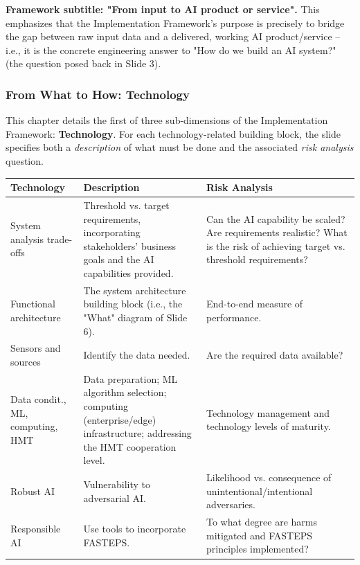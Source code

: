 \textbf{Framework subtitle: "From input to AI product or service".} This emphasizes that the Implementation Framework's purpose is precisely to bridge the gap between raw input data and a delivered, working AI product/service -- i.e., it is the concrete engineering answer to "How do we build an AI system?" (the question posed back in Slide 3).

\subsubsection{From What to How: Technology}

This chapter details the first of three sub-dimensions of the Implementation Framework: \textbf{Technology}. For each technology-related building block, the slide specifies both a \emph{description} of what must be done and the associated \emph{risk analysis} question.

\begin{center}
\begin{tabular}{p{3cm}p{4.6cm}p{4.6cm}}
\toprule
\textbf{Technology} & \textbf{Description} & \textbf{Risk Analysis} \\
\midrule
System analysis trade-offs & Threshold vs. target requirements, incorporating stakeholders' business goals and the AI capabilities provided. & Can the AI capability be scaled? Are requirements realistic? What is the risk of achieving target vs. threshold requirements? \\[0.2cm]
Functional architecture & The system architecture building block (i.e., the "What" diagram of Slide 6). & End-to-end measure of performance. \\[0.2cm]
Sensors and sources & Identify the data needed. & Are the required data available? \\[0.2cm]
Data condit., ML, computing, HMT & Data preparation; ML algorithm selection; computing (enterprise/edge) infrastructure; addressing the HMT cooperation level. & Technology management and technology levels of maturity. \\[0.2cm]
Robust AI & Vulnerability to adversarial AI. & Likelihood vs. consequence of unintentional/intentional adversaries. \\[0.2cm]
Responsible AI & Use tools to incorporate FASTEPS. & To what degree are harms mitigated and FASTEPS principles implemented? \\
\bottomrule
\end{tabular}
\end{center}

